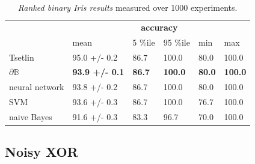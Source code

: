\documentclass{article}
\theoremstyle{plain}
\theoremstyle{definition}
\theoremstyle{remark}
\begin{document}
\begin{table}[t]
	\centering
	\begin{tabular}{llllll}
		\cline{2-6}
		\multicolumn{1}{c}{}                       & \multicolumn{5}{c}{\textbf{accuracy}}                                                                                                                                                            \\ \cline{2-6} 
		\multicolumn{1}{l|}{}                      & \multicolumn{1}{l|}{mean}                  & \multicolumn{1}{l|}{5 \%ile}       & \multicolumn{1}{l|}{95 \%ile}       & \multicolumn{1}{l|}{min}           & \multicolumn{1}{l|}{max}            \\ \hline
		\multicolumn{1}{|l|}{Tsetlin}              & \multicolumn{1}{l|}{95.0 +/- 0.2}          & \multicolumn{1}{l|}{86.7}          & \multicolumn{1}{l|}{100.0}          & \multicolumn{1}{l|}{80.0}          & \multicolumn{1}{l|}{100.0}          \\ \hline
		\multicolumn{1}{|l|}{$\partial\mathbb{B}$} & \multicolumn{1}{l|}{\textbf{93.9 +/- 0.1}} & \multicolumn{1}{l|}{\textbf{86.7}} & \multicolumn{1}{l|}{\textbf{100.0}} & \multicolumn{1}{l|}{\textbf{80.0}} & \multicolumn{1}{l|}{\textbf{100.0}} \\ \hline
		\multicolumn{1}{|l|}{neural network}       & \multicolumn{1}{l|}{93.8 +/- 0.2}          & \multicolumn{1}{l|}{86.7}          & \multicolumn{1}{l|}{100.0}           & \multicolumn{1}{l|}{80.0}          & \multicolumn{1}{l|}{100.0}           \\ \hline
		\multicolumn{1}{|l|}{SVM}                  & \multicolumn{1}{l|}{93.6 +/- 0.3}          & \multicolumn{1}{l|}{86.7}          & \multicolumn{1}{l|}{100.0}           & \multicolumn{1}{l|}{76.7}          & \multicolumn{1}{l|}{100.0}           \\ \hline
		\multicolumn{1}{|l|}{naive Bayes}          & \multicolumn{1}{l|}{91.6 +/- 0.3}          & \multicolumn{1}{l|}{83.3}          & \multicolumn{1}{l|}{96.7}           & \multicolumn{1}{l|}{70.0}          & \multicolumn{1}{l|}{100.0}           \\ \hline
	\end{tabular}
	\caption{{\em Ranked binary Iris results}  measured over 1000 experiments.}
	\label{tab:binary-iris-results}
\end{table}

\subsection{Noisy XOR}
\end{document}
